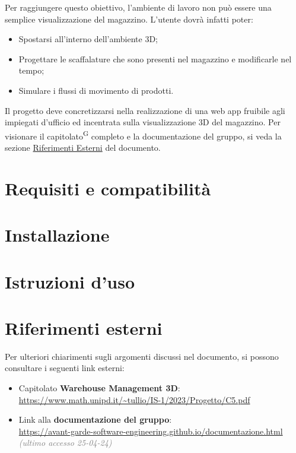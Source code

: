     Per raggiungere questo obiettivo, l'ambiente di lavoro non può essere una semplice visualizzazione del magazzino. L'utente dovrà infatti poter:
    \begin{itemize}
        \item Spostarsi all'interno dell'ambiente 3D;
        \item Progettare le scaffalature che sono presenti nel magazzino e modificarle nel tempo;
        \item Simulare i flussi di movimento di prodotti.
    \end{itemize}

    Il progetto deve concretizzarsi nella realizzazione di una web app fruibile agli impiegati d'ufficio ed incentrata sulla visualizzazione 3D del magazzino.
    Per visionare il capitolato\textsuperscript{G} completo e la documentazione del gruppo, si veda la sezione \hyperref[sec:riferimenti_esterni]{Riferimenti Esterni} 
    del documento.

\newpage


\section{Requisiti e compatibilità}\label{sec:requisiti_e_compatibilità}



\section{Installazione}\label{sec:installazione}


\section{Istruzioni d'uso}\label{sec:Istruzioni_uso}

\newpage
\newpage
\section{Riferimenti esterni}\label{sec:riferimenti_esterni}
Per ulteriori chiarimenti sugli argomenti discussi nel documento, si possono consultare i seguenti link esterni:
\begin{itemize}
    \item Capitolato \textbf{Warehouse Management 3D}:\\
    \url{https://www.math.unipd.it/~tullio/IS-1/2023/Progetto/C5.pdf} 
    \item Link alla \textbf{documentazione del gruppo}:\\
    \url{https://avant-garde-software-engineering.github.io/documentazione.html} \textcolor{gray}{\textit{(ultimo accesso 25-04-24)}}
\end{itemize}